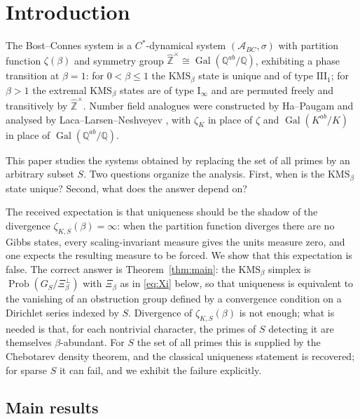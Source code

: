 \documentclass[11pt]{amsart}
\numberwithin{equation}{section}
\theoremstyle{definition}
\theoremstyle{remark}
\newcommand{\Z}{\mathbb{Z}}
\newcommand{\Q}{\mathbb{Q}}
\newcommand{\hZ}{\widehat{\Z}}
\newcommand{\Prob}{\operatorname{Prob}}
\newcommand{\Gal}{\operatorname{Gal}}
\newcommand{\cA}{\mathcal{A}}
\begin{document}
\maketitle
\tableofcontents

\section{Introduction}

The Bost--Connes system \cite{BC} is a $C^*$-dynamical system
$(\cA_{BC},\sigma)$ with partition function $\zeta(\beta)$ and symmetry group
$\hZ^\times\cong\Gal(\Q^{ab}/\Q)$, exhibiting a phase transition at $\beta=1$:
for $0<\beta\le1$ the $\mathrm{KMS}_\beta$ state is unique and of type
$\mathrm{III}_1$; for $\beta>1$ the extremal $\mathrm{KMS}_\beta$ states are of
type $\mathrm I_\infty$ and are permuted freely and transitively by
$\hZ^\times$. Number field analogues were constructed by Ha--Paugam \cite{HP}
and analysed by Laca--Larsen--Neshveyev \cite{LLN}, with $\zeta_K$ in place of
$\zeta$ and $\Gal(K^{ab}/K)$ in place of $\Gal(\Q^{ab}/\Q)$.

This paper studies the systems obtained by replacing the set of all primes by
an arbitrary subset $S$. Two questions organize the analysis. First, when is
the $\mathrm{KMS}_\beta$ state unique? Second, what does the answer depend on?

The received expectation is that uniqueness should be the shadow of the
divergence $\zeta_{K,S}(\beta)=\infty$: when the partition function diverges
there are no Gibbs states, every scaling-invariant measure gives the units
measure zero, and one expects the resulting measure to be forced. We show that
this expectation is false. The correct answer is Theorem~\ref{thm:main}: the
$\mathrm{KMS}_\beta$ simplex is $\Prob(G_S/\Xi_\beta^\perp)$ with $\Xi_\beta$
as in \eqref{eq:Xi} below, so that uniqueness is equivalent to the vanishing of
an obstruction group defined by a convergence condition on a Dirichlet series
indexed by $S$. Divergence of $\zeta_{K,S}(\beta)$ is not enough; what is
needed is that, for each nontrivial character, the primes of $S$ detecting it
are themselves $\beta$-abundant. For $S$ the set of all primes this is supplied
by the Chebotarev density theorem, and the classical uniqueness statement is
recovered; for sparse $S$ it can fail, and we exhibit the failure explicitly.

\subsection*{Main results}
\end{document}
